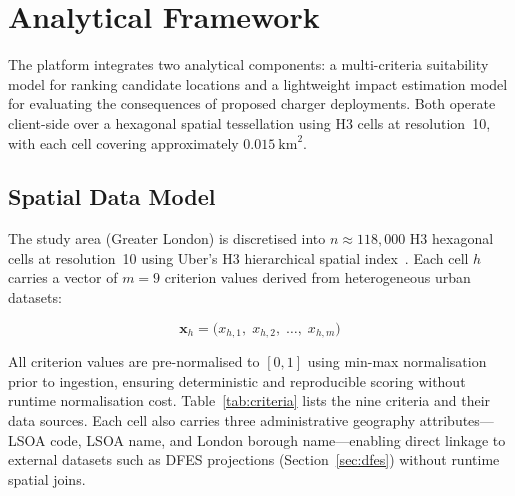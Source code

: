 
\section{Analytical Framework}
\label{sec:methodology}

The platform integrates two analytical components: a multi-criteria suitability model for ranking candidate locations and a lightweight impact estimation model for evaluating the consequences of proposed charger deployments. Both operate client-side over a hexagonal spatial tessellation using H3 cells at resolution~10, with each cell covering approximately $0.015~\text{km}^2$.

\subsection{Spatial Data Model}
\label{sec:spatial-data}

The study area (Greater London) is discretised into $n \approx 118{,}000$ H3 hexagonal cells at resolution~10 using Uber's H3 hierarchical spatial index~\cite{uber2018h3}. Each cell $h$ carries a vector of $m = 9$ criterion values derived from heterogeneous urban datasets:

\begin{equation}
\mathbf{x}_h = \bigl(x_{h,1},\; x_{h,2},\; \ldots,\; x_{h,m}\bigr)
\end{equation}

\noindent All criterion values are pre-normalised to $[0, 1]$ using min-max normalisation prior to ingestion, ensuring deterministic and reproducible scoring without runtime normalisation cost. Table~\ref{tab:criteria} lists the nine criteria and their data sources. Each cell also carries three administrative geography attributes---LSOA code, LSOA name, and London borough name---enabling direct linkage to external datasets such as DFES projections (Section~\ref{sec:dfes}) without runtime spatial joins.

